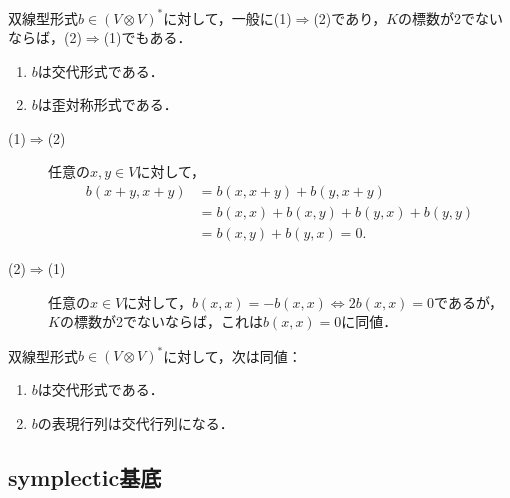 \documentclass[uplatex,dvipdfmx]{jsreport}
\begin{document}
\begin{lemma}
    双線型形式$b\in(V\otimes V)^*$に対して，一般に(1)$\Rightarrow$(2)であり，$K$の標数が2でないならば，(2)$\Rightarrow$(1)でもある．
    \begin{enumerate}
        \item $b$は交代形式である．
        \item $b$は歪対称形式である．
    \end{enumerate}
\end{lemma}
\begin{Proof}\mbox{}
    \begin{description}
        \item[(1)$\Rightarrow$(2)] 任意の$x,y\in V$に対して，
        \begin{align*}
            b(x+y,x+y)&=b(x,x+y)+b(y,x+y)\\
            &=b(x,x)+b(x,y)+b(y,x)+b(y,y)\\
            &=b(x,y)+b(y,x)=0.
        \end{align*}
        \item[(2)$\Rightarrow$(1)] 任意の$x\in V$に対して，$b(x,x)=-b(x,x)\Leftrightarrow 2b(x,x)=0$であるが，$K$の標数が2でないならば，これは$b(x,x)=0$に同値．
    \end{description}
\end{Proof}

\begin{lemma}
    双線型形式$b\in(V\otimes V)^*$に対して，次は同値：
    \begin{enumerate}
        \item $b$は交代形式である．
        \item $b$の表現行列は交代行列になる．
    \end{enumerate}
\end{lemma}

\subsection{symplectic基底}
\end{document}
